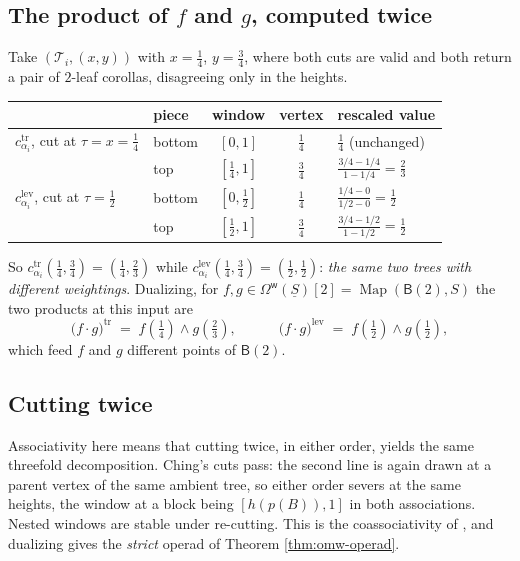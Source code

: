 \documentclass[12pt]{amsart}
\theoremstyle{definition}
\theoremstyle{remark}
\newcommand{\Map}{\operatorname{Map}}
\newcommand{\uS}{\underline{S}}
\newcommand{\BC}{\mathsf{B}}                     %
\newcommand{\Omw}{\Omega^{\mathsf{w}}}           %
\newcommand{\TreeF}{\mathcal{T}}                 %
\begin{document}
\subsection*{The product of \texorpdfstring{$f$ and $g$}{f and g}, computed twice}
Take $(\TreeF_i,(x,y))$ with $x=\tfrac14$, $y=\tfrac34$, where both cuts are valid and both return a pair of $2$-leaf corollas, disagreeing only in the heights.
\begin{center}
\begin{tabular}{@{}llccl@{}}
 & piece & window & vertex & rescaled value \\
\hline
$c^{\mathrm{tr}}_{\alpha_i}$, cut at $\tau = x = \tfrac14$
   & bottom & $[0,1]$          & $\tfrac14$ & $\tfrac14$ (unchanged) \\
   & top    & $[\tfrac14,1]$   & $\tfrac34$ & $\frac{3/4-1/4}{1-1/4} = \tfrac23$ \\
\hline
$c^{\mathrm{lev}}_{\alpha_i}$, cut at $\tau = \tfrac12$
   & bottom & $[0,\tfrac12]$   & $\tfrac14$ & $\frac{1/4-0}{1/2-0} = \tfrac12$ \\
   & top    & $[\tfrac12,1]$   & $\tfrac34$ & $\frac{3/4-1/2}{1-1/2} = \tfrac12$ \\
\hline
\end{tabular}
\end{center}
So $c^{\mathrm{tr}}_{\alpha_i}(\tfrac14,\tfrac34) = (\tfrac14,\tfrac23)$ while $c^{\mathrm{lev}}_{\alpha_i}(\tfrac14,\tfrac34) = (\tfrac12,\tfrac12)$: \emph{the same two trees with different weightings}. Dualizing, for $f,g\in \Omw(\uS)[2] = \Map(\BC(2),S)$ the two products at this input are
\[ \big(f\cdot g\big)^{\mathrm{tr}} \;=\; f(\tfrac14)\wedge g(\tfrac23), \quad\quad\quad \big(f\cdot g\big)^{\mathrm{lev}} \;=\; f(\tfrac12)\wedge g(\tfrac12),\]
which feed $f$ and $g$ different points of $\BC(2)$.

\subsection*{Cutting twice}
Associativity here means that cutting twice, in either order, yields the same threefold decomposition. Ching's cuts pass: the second line is again drawn at a parent vertex of the same ambient tree, so either order severs at the same heights, the window at a block being $[h(p(B)),1]$ in both associations. Nested windows are stable under re-cutting. This is the coassociativity of \cite[\S 4]{Ching-thesis}, and dualizing gives the \emph{strict} operad of Theorem \ref{thm:omw-operad}.
\end{document}
